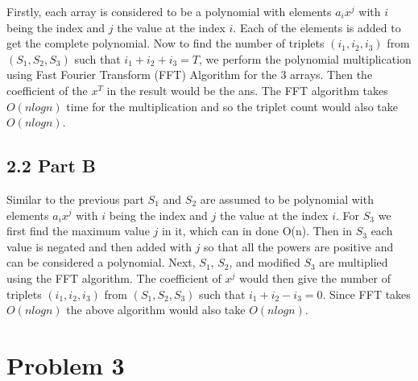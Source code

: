 \documentclass[12pt]{article}
\begin{document}
Firstly, each array is considered to be a polynomial with elements \(a_ix^j\) with $i$ being the index and $j$ the value at the index $i$. Each of the elements is added to get the complete polynomial. Now to find the number of triplets \((i_1, i_2, i_3)\) from \((S_1, S_2, S_3)\) such that \(i_1+i_2+i_3=T\), we perform the polynomial multiplication using Fast Fourier Transform (FFT) Algorithm for the 3 arrays. Then the coefficient of the \textbf{\(x^T\)} in the result would be the ans. The FFT algorithm takes \(O(nlogn)\) time for the multiplication and so the triplet count would also take \(O(nlogn)\). 



\subsection*{2.2 Part B}
\vspace{10pt}

Similar to the previous part $S_1$ and $S_2$ are assumed to be polynomial with elements \(a_ix^j\)  with $i$ being the index and $j$ the value at the index $i$. For $S_3$ we first find the maximum value $j$ in it, which can in done O(n). Then in $S_3$ each value is negated and then added with $j$ so that all the powers are positive and can be considered a polynomial. Next, $S_1$, $S_2$, and modified $S_3$ are multiplied using the FFT algorithm. The coefficient of $x^j$ would then give the number of triplets  \((i_1, i_2, i_3)\) from \((S_1, S_2, S_3)\) such that \(i_1+i_2-i_3=0\). Since FFT takes \(O(nlogn)\) the above algorithm would also take \(O(nlogn)\). 


\section*{Problem 3}

\end{document}

